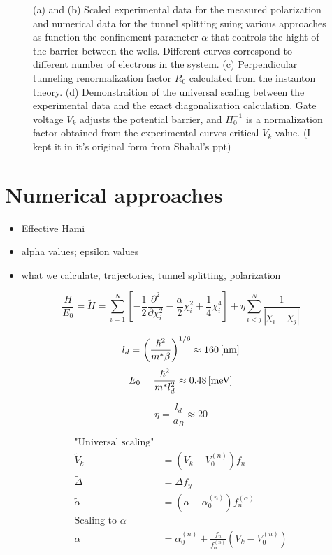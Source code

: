 \documentclass[prb,twocolumn,showpacs,preprintnumbers,amsmath,amssymb, superscriptaddress]{revtex4-2}
\newcommand{\1}{{1\hspace*{-0.5ex} \textrm{l} \hspace*{0.5ex}}}
\begin{document}
\begin{figure}[h!]
\begin{center}
		 	\caption{(a) and (b) Scaled experimental data for the measured polarization and numerical data for the tunnel splitting suing various approaches as function the confinement parameter $\alpha$ that controls the hight of the barrier between the wells. Different curves correspond to different number of electrons in the system. (c) Perpendicular tunneling renormalization factor $R_0$ calculated from the instanton theory. (d) Demonstraition of the universal scaling between the experimental data and the exact diagonalization calculation. Gate voltage $V_k$ adjusts the potential barrier, and $\Pi_0^{-1}$ is a normalization factor obtained from the experimental curves critical $V_k$ value. (I kept it in it's original form from Shahal's ppt) }
     
     \label{fig:experimental_setup}
    \end{center}
\end{figure}    
  	

\section{Numerical approaches}
\begin{itemize}
\item Effective Hami
\item alpha values; epsilon values
\item what we calculate, trajectories, tunnel splitting, polarization
\end{itemize}

\begin{equation}
\frac{H}{E_0} = \tilde{H} = \sum_{i = 1}^N \left[ -\frac{1}{2}\frac{\partial^2}{\partial \chi_i^2} - \frac{\alpha}{2}\chi_i^2 + \frac{1}{4} \chi_i^4 \right] + \eta \sum_{i < j}^N \frac{1}{\left| \chi_i - \chi_j  \right|}
\end{equation}

\begin{equation}
l_d = \left( \frac{\hbar^2}{m^* \beta} \right)^{1/6} \approx 160 \,{\rm{ [nm]}}
\end{equation}
\begin{equation}
E_0 = \frac{\hbar^2}{m^* l_d^2} \approx 0.48 \,{\rm{ [meV]}}
\end{equation}

\begin{equation}
\eta = \frac{l_d}{a_B} \approx 20
\end{equation}

\begin{align}
{\text{"Universal scaling"}}\\
\tilde{V}_k &= (V_k - V_{0}^{(n)})f_n \\
\tilde{\Delta} &= \Delta f_y \\
\tilde{\alpha} &= (\alpha - \alpha_0^{(n)}) f_n^{(\alpha)} \\
{\text{Scaling to }} \alpha \\
\alpha &= \alpha_0^{(n)} + \frac{f_n}{f_\alpha^{(n)}} \left(V_k - V_0^{(n)}  \right)
\end{align}
\end{document}
